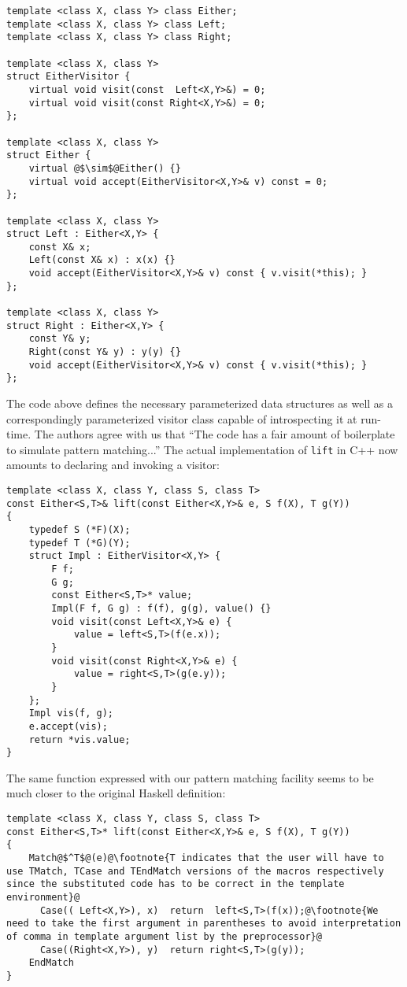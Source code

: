 \documentclass[preprint]{sigplanconf}
\DeclareRobustCommand{\code}[1]{{\lstinline[breaklines=false]{#1}}}
\begin{document}
\begin{lstlisting}
template <class X, class Y> class Either;
template <class X, class Y> class Left;
template <class X, class Y> class Right;

template <class X, class Y>
struct EitherVisitor {
    virtual void visit(const  Left<X,Y>&) = 0;
    virtual void visit(const Right<X,Y>&) = 0;
};

template <class X, class Y>
struct Either {
    virtual @$\sim$@Either() {}
    virtual void accept(EitherVisitor<X,Y>& v) const = 0;
};

template <class X, class Y>
struct Left : Either<X,Y> {
    const X& x;
    Left(const X& x) : x(x) {}
    void accept(EitherVisitor<X,Y>& v) const { v.visit(*this); }
};

template <class X, class Y>
struct Right : Either<X,Y> {
    const Y& y;
    Right(const Y& y) : y(y) {}
    void accept(EitherVisitor<X,Y>& v) const { v.visit(*this); }
};
\end{lstlisting}

The code above defines the necessary parameterized data structures as well as a 
correspondingly parameterized visitor class capable of introspecting it at 
run-time. The authors agree with us that ``The code has a fair amount of 
boilerplate to simulate pattern matching...'' The actual implementation of 
\code{lift} in C++ now amounts to declaring and invoking a visitor:

\begin{lstlisting}
template <class X, class Y, class S, class T>
const Either<S,T>& lift(const Either<X,Y>& e, S f(X), T g(Y))
{
    typedef S (*F)(X);
    typedef T (*G)(Y);
    struct Impl : EitherVisitor<X,Y> {
        F f;
        G g;
        const Either<S,T>* value;
        Impl(F f, G g) : f(f), g(g), value() {}
        void visit(const Left<X,Y>& e) {
            value = left<S,T>(f(e.x));
        }
        void visit(const Right<X,Y>& e) {
            value = right<S,T>(g(e.y));
        }
    };
    Impl vis(f, g);
    e.accept(vis);
    return *vis.value;
}
\end{lstlisting}

The same function expressed with our pattern matching facility seems to be much 
closer to the original Haskell definition:

\begin{lstlisting}[keepspaces,columns=flexible]
template <class X, class Y, class S, class T>
const Either<S,T>* lift(const Either<X,Y>& e, S f(X), T g(Y))
{
    Match@$^T$@(e)@\footnote{T indicates that the user will have to use TMatch, TCase and TEndMatch versions of the macros respectively since the substituted code has to be correct in the template environment}@
      Case(( Left<X,Y>), x)  return  left<S,T>(f(x));@\footnote{We need to take the first argument in parentheses to avoid interpretation of comma in template argument list by the preprocessor}@
      Case((Right<X,Y>), y)  return right<S,T>(g(y));
    EndMatch
}
\end{lstlisting}
\end{document}
